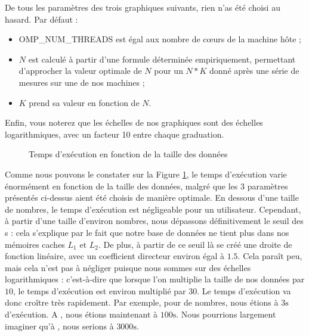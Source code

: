 \documentclass[12pt]{article}
\begin{document}
De tous les paramètres des trois graphiques suivants, rien n'as été choisi au
hasard. Par défaut :
\begin{itemize}
    \item OMP\_NUM\_THREADS est égal aux nombre de c\oe{}urs de la machine hôte ;
        \item $N$ est calculé à partir d'une formule déterminée empiriquement,
            permettant d'approcher la valeur optimale de $N$ pour un $N*K$ donné
            après une série de mesures sur une de nos machines ;
        \item $K$ prend sa valeur en fonction de $N$.
\end{itemize}

Enfin, vous noterez que les échelles de nos graphiques sont des échelles
logarithmiques, avec un facteur 10 entre chaque graduation. 

\begin{figure}
    \begin{center}
        \caption{Temps d'exécution en fonction de la taille des données}
        \label{time-to-data-size}
    \end{center}
\end{figure}

Comme nous pouvons le constater sur la Figure \ref{time-to-data-size}, le temps
d'exécution varie énormément en fonction de la taille des données, malgré que
les 3 paramètres présentés ci-dessus aient été choisis de manière optimale. En
dessous d'une taille de  nombres, le temps d'exécution est
négligeable pour un utilisateur. Cependant, à partir d'une taille d'environ
 nombres, nous dépassons définitivement le seuil des
\si{\second} : cela s'explique par le fait que notre base de
données ne tient plus dans nos mémoires caches $L_1 \text{ et } L_2$. De plus, à
partir de ce seuil là se créé une droite de fonction linéaire, avec un
coefficient directeur environ égal à $1.5$. Cela paraît peu, mais cela n'est pas
à négliger puisque nous sommes sur des échelles logarithmiques : c'est-à-dire
que lorsque l'on multiplie la taille de nos données par $10$, le temps
d'exécution est environ multiplié par $30$. Le temps d'exécution va donc croître
très rapidement. Par exemple, pour  de nombres, nous étions à
$3\si{\second}$ d'exécution. A , nous étions maintenant à
$100\si{\second}$. Nous pourrions largement imaginer qu'à ,
nous serions à $3000\si{\second}$.
\end{document}
